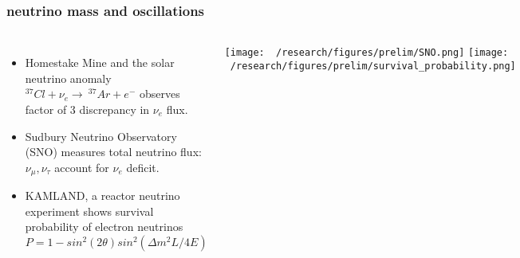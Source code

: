\documentclass{beamer}
\begin{document}
	\begin{frame}
		\frametitle{neutrino mass and oscillations}
		\begin{columns}[c] %
			
			\begin{itemize}
				\setlength\itemsep{2em}
				\item Homestake Mine and the solar neutrino anomaly $^{37}Cl+\nu_e \rightarrow \ ^{37}Ar + e^-$ observes factor of 3 discrepancy in $\nu_e$ flux.
				\item Sudbury Neutrino Observatory (SNO) measures total neutrino flux: $\nu_{\mu}, \nu_{\tau}$ account for $\nu_e$ deficit.
				\item KAMLAND, a reactor neutrino experiment shows survival probability of electron neutrinos $P = 1 - sin^2 (2\theta)sin^2(\Delta m^2 L \slash 4E)$
				
			\end{itemize}
			
			
			\texttt{[image: ~/research/figures/prelim/SNO.png]}
			\texttt{[image: ~/research/figures/prelim/survival\_probability.png]}
			
		\end{columns}
	\end{frame}
	
\end{document}
